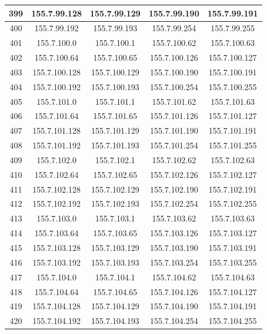 \documentclass[letterpaper,12pt]{article}
\begin{document}
\begin{longtable}{|c|c|c|c|c|}
        399 & 155.7.99.128 & 155.7.99.129 & 155.7.99.190 & 155.7.99.191 \\ \hline
        400 & 155.7.99.192 & 155.7.99.193 & 155.7.99.254 & 155.7.99.255 \\ \hline
        401 & 155.7.100.0 & 155.7.100.1 & 155.7.100.62 & 155.7.100.63 \\ \hline
        402 & 155.7.100.64 & 155.7.100.65 & 155.7.100.126 & 155.7.100.127 \\ \hline
        403 & 155.7.100.128 & 155.7.100.129 & 155.7.100.190 & 155.7.100.191 \\ \hline
        404 & 155.7.100.192 & 155.7.100.193 & 155.7.100.254 & 155.7.100.255 \\ \hline
        405 & 155.7.101.0 & 155.7.101.1 & 155.7.101.62 & 155.7.101.63 \\ \hline
        406 & 155.7.101.64 & 155.7.101.65 & 155.7.101.126 & 155.7.101.127 \\ \hline
        407 & 155.7.101.128 & 155.7.101.129 & 155.7.101.190 & 155.7.101.191 \\ \hline
        408 & 155.7.101.192 & 155.7.101.193 & 155.7.101.254 & 155.7.101.255 \\ \hline
        409 & 155.7.102.0 & 155.7.102.1 & 155.7.102.62 & 155.7.102.63 \\ \hline
        410 & 155.7.102.64 & 155.7.102.65 & 155.7.102.126 & 155.7.102.127 \\ \hline
        411 & 155.7.102.128 & 155.7.102.129 & 155.7.102.190 & 155.7.102.191 \\ \hline
        412 & 155.7.102.192 & 155.7.102.193 & 155.7.102.254 & 155.7.102.255 \\ \hline
        413 & 155.7.103.0 & 155.7.103.1 & 155.7.103.62 & 155.7.103.63 \\ \hline
        414 & 155.7.103.64 & 155.7.103.65 & 155.7.103.126 & 155.7.103.127 \\ \hline
        415 & 155.7.103.128 & 155.7.103.129 & 155.7.103.190 & 155.7.103.191 \\ \hline
        416 & 155.7.103.192 & 155.7.103.193 & 155.7.103.254 & 155.7.103.255 \\ \hline
        417 & 155.7.104.0 & 155.7.104.1 & 155.7.104.62 & 155.7.104.63 \\ \hline
        418 & 155.7.104.64 & 155.7.104.65 & 155.7.104.126 & 155.7.104.127 \\ \hline
        419 & 155.7.104.128 & 155.7.104.129 & 155.7.104.190 & 155.7.104.191 \\ \hline
        420 & 155.7.104.192 & 155.7.104.193 & 155.7.104.254 & 155.7.104.255 \\ \hline

\end{longtable}
\end{document}
